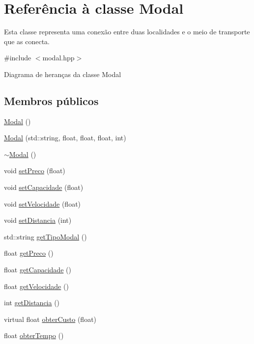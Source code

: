 \hypertarget{classModal}{}\section{Referência à classe Modal}
\label{classModal}


Esta classe representa uma conexão entre duas localidades e o meio de transporte que as conecta.  




{\ttfamily \#include $<$modal.\+hpp$>$}



Diagrama de heranças da classe Modal
\subsection*{Membros públicos}
\begin{DoxyCompactItemize}
\item 
\hyperlink{classModal_a8762a8d9f09cb6a2ec5f54f5d26412c0}{Modal} ()
\item 
\hyperlink{classModal_a17560766811007d0af99fd6099325d52}{Modal} (std\+::string, float, float, float, int)
\item 
\hyperlink{classModal_a4a2e7830211c07075078b5d5186dab54}{$\sim$\+Modal} ()
\item 
void \hyperlink{classModal_ade6a106d1c7a0bc095ea1a012891ed00}{set\+Preco} (float)
\item 
void \hyperlink{classModal_affd03b3938af5cbe3541f82ae5ad8b6a}{set\+Capacidade} (float)
\item 
void \hyperlink{classModal_ac8da271cfb67468b89cbca0b3951b9f7}{set\+Velocidade} (float)
\item 
void \hyperlink{classModal_adae73e94a5d76a2a97329cba1fe7fb20}{set\+Distancia} (int)
\item 
std\+::string \hyperlink{classModal_ad0e185312cd36ad83b4e19fd1cd532be}{get\+Tipo\+Modal} ()
\item 
float \hyperlink{classModal_ae124094018f5e049d5137a8eec893a79}{get\+Preco} ()
\item 
float \hyperlink{classModal_ac9750361d92b6ad91674851852c7362f}{get\+Capacidade} ()
\item 
float \hyperlink{classModal_acac9a4b13c4596842253e25f84872b32}{get\+Velocidade} ()
\item 
int \hyperlink{classModal_a1eedb4dfdddd81a5a7c7b3203e50e68c}{get\+Distancia} ()
\item 
virtual float \hyperlink{classModal_a20cee7247cce33806d681e1d60347cc5}{obter\+Custo} (float)
\item 
float \hyperlink{classModal_a71e2bda54694608c149ae0d72b3693a4}{obter\+Tempo} ()
\end{DoxyCompactItemize}

